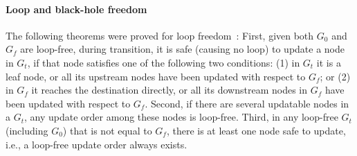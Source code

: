 \paragraph{Loop and black-hole freedom}

The following theorems were proved for loop freedom~\cite{loopfree}:
First, given both $G_0$ and $G_f$ are loop-free,
during transition, it is safe (causing no loop) to update a node in  $G_t$, if that node satisfies 
one of the following two conditions: (1) in $G_t$ it is a leaf node, or all its upstream nodes
have been updated with respect to $G_f$; or (2) in $G_f$ it reaches the destination directly,
or all its downstream nodes in $G_f$ have been updated with respect to $G_f$.
Second, if there are several updatable nodes in a $G_t$, any update order among these nodes is
loop-free. Third, in any loop-free $G_t$ (including $G_0$) that is not equal to $G_f$,
there is at least one node safe to update, i.e., a loop-free update order always exists.


%
%

